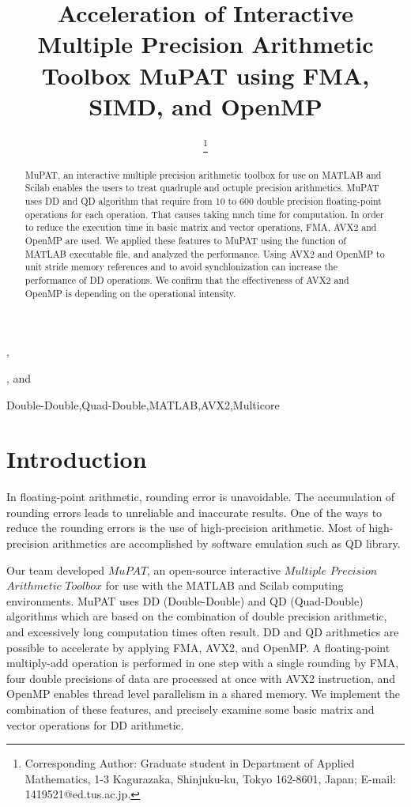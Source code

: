 \documentclass{IOS-Book-Article}
\begin{document}
\pagestyle{plain}

\begin{frontmatter} 
\title{ Acceleration of Interactive Multiple Precision Arithmetic Toolbox MuPAT using FMA,  SIMD, and OpenMP }
\author[A]{{ }
\thanks{Corresponding Author: Graduate student in Department of Applied Mathematics, 1-3 Kagurazaka, Shinjuku-ku, Tokyo 162-8601, Japan; E-mail: 1419521@ed.tus.ac.jp.}},
\author[A]{ },
 and 
\author[B]{  }

\address[A]{Tokyo University of Science, Japan}
\address[B]{ University of Tsukuba, Japan}

\begin{abstract}
MuPAT, an interactive multiple precision arithmetic toolbox for use on MATLAB and Scilab enables the users to treat quadruple and octuple precision arithmetics. MuPAT uses DD and QD algorithm that require from 10 to 600 double precision floating-point operations for each operation. That causes taking much time for computation. In order to reduce the execution time in basic matrix and vector operations, FMA, AVX2 and OpenMP are used. We applied these features to MuPAT using the function of MATLAB executable file, and analyzed the performance. Using AVX2 and OpenMP to unit stride memory references and to avoid synchlonization can increase the performance of DD operations. We confirm that the effectiveness of AVX2 and OpenMP is depending on the operational intensity. 
\end{abstract}
\begin{keyword}
Double-Double\sep Quad-Double\sep MATLAB\sep  AVX2\sep Multicore
\end{keyword}
\end{frontmatter}
\section{Introduction}

In floating-point arithmetic, rounding error is unavoidable. The accumulation of rounding errors leads to unreliable and inaccurate results. One of the ways to reduce the rounding errors is the use of high-precision arithmetic.  
Most of high-precision arithmetics are accomplished by software emulation such as QD library\cite{QD}. 

Our team developed $MuPAT$, an open-source interactive $Multiple$ $Precision$ $Arithmetic$ $Toolbox$\cite{saito, hota} for use with the MATLAB and Scilab computing environments. MuPAT uses DD (Double-Double)\cite{DD} and QD (Quad-Double)\cite{QD,DD} algorithms which are based on the combination of double precision arithmetic, and excessively long computation times often result. 
DD and QD arithmetics are possible to accelerate by applying FMA\cite{SIMD}, AVX2\cite{SIMD}, and OpenMP\cite{omp}. A floating-point multiply-add operation is performed in one step with a single rounding by FMA, four double precisions of data are processed at once with AVX2 instruction, and OpenMP enables thread level parallelism in a shared memory. 
We implement the combination of these features, and precisely examine some basic matrix and vector operations for DD arithmetic. 
\end{document}
